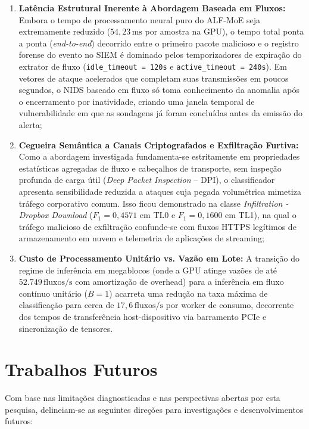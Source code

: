 \begin{enumerate}
    \item \textbf{Latência Estrutural Inerente à Abordagem Baseada em Fluxos:}
    Embora o tempo de processamento neural puro do ALF-MoE seja extremamente reduzido ($54{,}23\,\mathrm{ms}$ por amostra na GPU), o tempo total ponta a ponta (\emph{end-to-end}) decorrido entre o primeiro pacote malicioso e o registro forense do evento no SIEM é dominado pelos temporizadores de expiração do extrator de fluxo (\texttt{idle\_timeout = 120s} e \texttt{active\_timeout = 240s}). Em vetores de ataque acelerados que completam suas transmissões em poucos segundos, o NIDS baseado em fluxo só toma conhecimento da anomalia após o encerramento por inatividade, criando uma janela temporal de vulnerabilidade em que as sondagens já foram concluídas antes da emissão do alerta;
    
    \item \textbf{Cegueira Semântica a Canais Criptografados e Exfiltração Furtiva:}
    Como a abordagem investigada fundamenta-se estritamente em propriedades estatísticas agregadas de fluxo e cabeçalhos de transporte, sem inspeção profunda de carga útil (\emph{Deep Packet Inspection} -- DPI), o classificador apresenta sensibilidade reduzida a ataques cuja pegada volumétrica mimetiza tráfego corporativo comum. Isso ficou demonstrado na classe \emph{Infiltration - Dropbox Download} ($F_1 = 0{,}4571$ em TL0 e $F_1 = 0{,}1600$ em TL1), na qual o tráfego malicioso de exfiltração confunde-se com fluxos HTTPS legítimos de armazenamento em nuvem e telemetria de aplicações de streaming;
    
    \item \textbf{Custo de Processamento Unitário vs. Vazão em Lote:}
    A transição do regime de inferência em megablocos (onde a GPU atinge vazões de até $52.749\,\mathrm{fluxos/s}$ com amortização de overhead) para a inferência em fluxo contínuo unitário ($B=1$) acarreta uma redução na taxa máxima de classificação para cerca de $17{,}6\,\mathrm{fluxos/s}$ por worker de consumo, decorrente dos tempos de transferência host-dispositivo via barramento PCIe e sincronização de tensores.
\end{enumerate}


\section{Trabalhos Futuros}
\label{sec:trabalhos_futuros}

Com base nas limitações diagnosticadas e nas perspectivas abertas por esta pesquisa, delineiam-se as seguintes direções para investigações e desenvolvimentos futuros:

